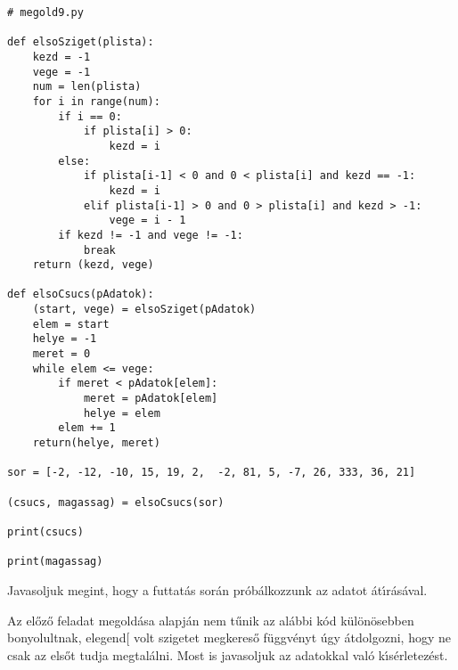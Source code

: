 \begin{Verbatim}[fontsize=\small]
# megold9.py

def elsoSziget(plista):
    kezd = -1
    vege = -1
    num = len(plista)
    for i in range(num):
        if i == 0:
            if plista[i] > 0:
                kezd = i
        else:
            if plista[i-1] < 0 and 0 < plista[i] and kezd == -1:
                kezd = i
            elif plista[i-1] > 0 and 0 > plista[i] and kezd > -1:
                vege = i - 1
        if kezd != -1 and vege != -1:
            break
    return (kezd, vege)

def elsoCsucs(pAdatok):
    (start, vege) = elsoSziget(pAdatok)
    elem = start
    helye = -1
    meret = 0
    while elem <= vege:
        if meret < pAdatok[elem]:
            meret = pAdatok[elem]
            helye = elem
        elem += 1
    return(helye, meret)

sor = [-2, -12, -10, 15, 19, 2,  -2, 81, 5, -7, 26, 333, 36, 21] 

(csucs, magassag) = elsoCsucs(sor)

print(csucs)

print(magassag)
\end{Verbatim}

\noindent Javasoljuk megint, hogy a futtat\'as sor\'an pr\'ob\'alkozzunk az adatot \'at\'{\i}r\'as\'aval.

\themegold

Az el\H{o}z\H{o} feladat megold\'asa alapj\'an nem t\H{u}nik az al\'abbi k\'od k\"ul\"on\"osebben 
bonyolultnak, elegend[ volt szigetet megkeres\H{o} f\"uggv\'enyt \'ugy \'atdolgozni, hogy ne csak az 
   els\H{o}t tudja megtal\'alni. Most is javasoljuk az adatokkal val\'o k\'{\i}s\'erletez\'est.

